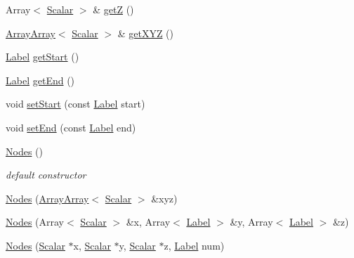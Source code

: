 \begin{DoxyCompactItemize}
\item 
Array$<$ \hyperlink{namespaceHSF_a7419497552ed1c5631a818b75eed1aec}{Scalar} $>$ \& \hyperlink{classHSF_1_1Nodes_a2de318fe71131d231c84a79bc228f35b}{getZ} ()
\item 
\hyperlink{classHSF_1_1ArrayArray}{ArrayArray}$<$ \hyperlink{namespaceHSF_a7419497552ed1c5631a818b75eed1aec}{Scalar} $>$ \& \hyperlink{classHSF_1_1Nodes_a11ee5739c1d94dd00efb39f461a257ff}{getXYZ} ()
\item 
\hyperlink{namespaceHSF_ae65d72be782e989396ebe5ec6ae4c2b6}{Label} \hyperlink{classHSF_1_1Nodes_ac040e3ba37f121943eb2d90c785addce}{getStart} ()
\item 
\hyperlink{namespaceHSF_ae65d72be782e989396ebe5ec6ae4c2b6}{Label} \hyperlink{classHSF_1_1Nodes_aa61b5c705ee968a95ba9036e55574ca1}{getEnd} ()
\item 
void \hyperlink{classHSF_1_1Nodes_ab8ee8ad861d256901605c11552e003d4}{setStart} (const \hyperlink{namespaceHSF_ae65d72be782e989396ebe5ec6ae4c2b6}{Label} start)
\item 
void \hyperlink{classHSF_1_1Nodes_a7dd80e94f1eae9c903ad4b2797dc0375}{setEnd} (const \hyperlink{namespaceHSF_ae65d72be782e989396ebe5ec6ae4c2b6}{Label} end)
\item 
\hyperlink{classHSF_1_1Nodes_a4cf0a36ef0cbd1d2183e6f426289b3ef}{Nodes} ()
\begin{DoxyCompactList}\small\item\em default constructor \item\end{DoxyCompactList}\item 
\hyperlink{classHSF_1_1Nodes_a6c4e1453888f5fa3008d992d1f19c1b4}{Nodes} (\hyperlink{classHSF_1_1ArrayArray}{ArrayArray}$<$ \hyperlink{namespaceHSF_a7419497552ed1c5631a818b75eed1aec}{Scalar} $>$ \&xyz)
\item 
\hyperlink{classHSF_1_1Nodes_aa08a28dcddd6fdbc64fef3d3c7bfba82}{Nodes} (Array$<$ \hyperlink{namespaceHSF_a7419497552ed1c5631a818b75eed1aec}{Scalar} $>$ \&x, Array$<$ \hyperlink{namespaceHSF_ae65d72be782e989396ebe5ec6ae4c2b6}{Label} $>$ \&y, Array$<$ \hyperlink{namespaceHSF_ae65d72be782e989396ebe5ec6ae4c2b6}{Label} $>$ \&z)
\item 
\hyperlink{classHSF_1_1Nodes_a545e2813acfe02611c3ef8d659c8ce2f}{Nodes} (\hyperlink{namespaceHSF_a7419497552ed1c5631a818b75eed1aec}{Scalar} $\ast$x, \hyperlink{namespaceHSF_a7419497552ed1c5631a818b75eed1aec}{Scalar} $\ast$y, \hyperlink{namespaceHSF_a7419497552ed1c5631a818b75eed1aec}{Scalar} $\ast$z, \hyperlink{namespaceHSF_ae65d72be782e989396ebe5ec6ae4c2b6}{Label} num)

\end{DoxyCompactItemize}
